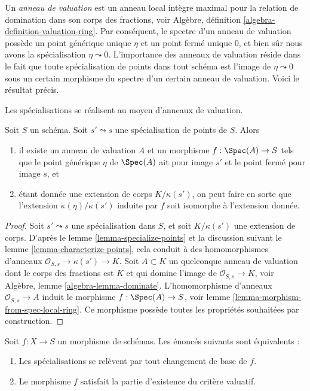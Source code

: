 \noindent
Un {\it anneau de valuation} est un anneau local intègre maximal pour la relation
de domination dans son corps des fractions,
voir Algèbre, définition \ref{algebra-definition-valuation-ring}.
Par conséquent, le spectre d'un anneau de valuation possède un point générique
unique $\eta$ et un point fermé unique $0$, et bien sûr nous avons la
spécialisation $\eta \leadsto 0$.
L'importance des anneaux de valuation réside dans le fait que toute spécialisation
de points dans tout schéma est l'image de $\eta \leadsto
0$ sous un certain morphisme du spectre d'un certain anneau de valuation.
Voici le résultat précis.

\begin{lemma}
\label{lemma-points-specialize}
\begin{slogan}
Les spécialisations se réalisent au moyen d'anneaux de valuation.
\end{slogan}
Soit $S$ un schéma. Soit $s' \leadsto s$ une spécialisation de points de $S$.
Alors
\begin{enumerate}
\item il existe un anneau de valuation $A$ et un morphisme
$f : \Spec(A) \to S$ tels que le point générique $\eta$ de
$\Spec(A)$ ait pour image $s'$ et le point fermé pour image $s$, et \item
étant donnée une extension de corps $K/\kappa(s')$,
on peut faire en sorte que l'extension
$\kappa(\eta)/\kappa(s')$ induite par
$f$ soit isomorphe à l'extension donnée.
\end{enumerate}
\end{lemma}

\begin{proof}
Soit $s' \leadsto s$ une spécialisation dans $S$, et soit
$K/\kappa(s')$ une extension de corps. D'après le lemme
\ref{lemma-specialize-points} et la
discussion suivant le lemme
\ref{lemma-characterize-points}, cela conduit
à des homomorphismes d'anneaux $\mathcal{O}_{S, s} \to \kappa(s') \to
K$. Soit $A \subset K$ un quelconque anneau de valuation dont le corps des
fractions est $K$ et qui domine l'image de $\mathcal{O}_{S, s} \to K$, voir
Algèbre, lemme \ref{algebra-lemma-dominate}.
L'homomorphisme d'anneaux $\mathcal{O}_{S, s} \to A$ induit le morphisme
$f : \Spec(A) \to S$, voir
lemme \ref{lemma-morphism-from-spec-local-ring}. Ce
morphisme possède toutes les propriétés souhaitées par construction.
\end{proof}

\begin{lemma}
\label{lemma-lift-specializations-valuative}
Soit $f : X \to S$ un morphisme de schémas. Les
énoncés suivants sont équivalents :
\begin{enumerate}
\item Les spécialisations se relèvent par tout changement de
base de $f$. \item Le morphisme $f$ satisfait la partie d'existence
du critère valuatif.
\end{enumerate}
\end{lemma}

